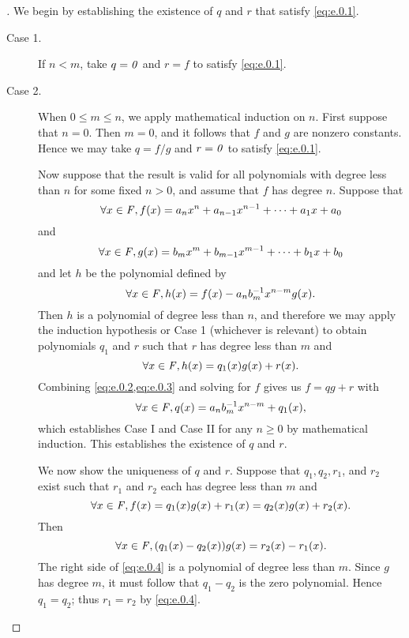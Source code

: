\begin{proof}[]
  We begin by establishing the existence of \(q\) and \(r\) that satisfy \cref{eq:e.0.1}.
  \begin{description}
    \item[Case 1.]
      If \(n < m\), take \(q = \mathit{0}\) and \(r = f\) to satisfy \cref{eq:e.0.1}.
    \item[Case 2.]
      When \(0 \leq m \leq n\), we apply mathematical induction on \(n\).
      First suppose that \(n = 0\).
      Then \(m = 0\), and it follows that \(f\) and \(g\) are nonzero constants.
      Hence we may take \(q = f / g\) and \(r = \mathit{0}\) to satisfy \cref{eq:e.0.1}.

      Now suppose that the result is valid for all polynomials with degree less than \(n\) for some fixed \(n > 0\), and assume that \(f\) has degree \(n\).
      Suppose that
      \[
        \forall x \in \mathit{F}, f(x) = a_n x^n + a_{n - 1} x^{n - 1} + \cdots + a_1 x + a_0
      \]
      and
      \[
        \forall x \in \mathit{F}, g(x) = b_m x^m + b_{m - 1} x^{m - 1} + \cdots + b_1 x + b_0
      \]
      and let \(h\) be the polynomial defined by
      \begin{equation}\label{eq:e.0.2}
        \forall x \in \mathit{F}, h(x) = f(x) - a_n b_m^{-1} x^{n - m} g(x).
      \end{equation}
      Then \(h\) is a polynomial of degree less than \(n\), and therefore we may apply the induction hypothesis or Case 1 (whichever is relevant) to obtain polynomials \(q_1\) and \(r\) such that \(r\) has degree less than \(m\) and
      \begin{equation}\label{eq:e.0.3}
        \forall x \in \mathit{F}, h(x) = q_1(x) g(x) + r(x).
      \end{equation}
      Combining \cref{eq:e.0.2,eq:e.0.3} and solving for \(f\) gives us \(f = q g + r\) with
      \[
        \forall x \in \mathit{F}, q(x) = a_n b_m^{-1} x^{n - m} + q_1(x),
      \]
      which establishes Case I and Case II for any \(n \geq 0\) by mathematical induction.
      This establishes the existence of \(q\) and \(r\).

      We now show the uniqueness of \(q\) and \(r\).
      Suppose that \(q_1, q_2, r_1\), and \(r_2\) exist such that \(r_1\) and \(r_2\) each has degree less than \(m\) and
      \[
        \forall x \in \mathit{F}, f(x) = q_1(x) g(x) + r_1(x) = q_2(x) g(x) + r_2(x).
      \]
      Then
      \begin{equation}\label{eq:e.0.4}
        \forall x \in \mathit{F}, (q_1(x) - q_2(x)) g(x) = r_2(x) - r_1(x).
      \end{equation}
      The right side of \cref{eq:e.0.4} is a polynomial of degree less than \(m\).
      Since \(g\) has degree \(m\), it must follow that \(q_1 - q_2\) is the zero polynomial.
      Hence \(q_1 = q_2\);
      thus \(r_1 = r_2\) by \cref{eq:e.0.4}.
  \end{description}
\end{proof}

